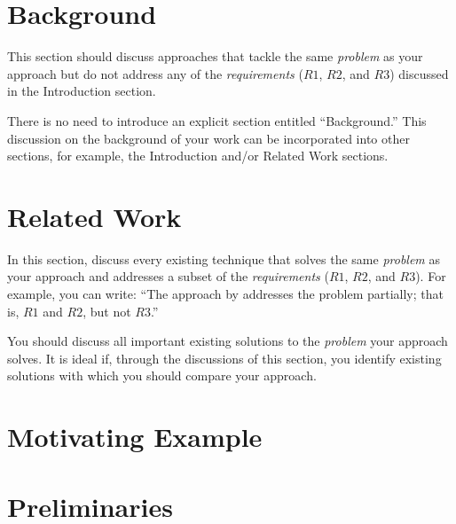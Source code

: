 \section{Background}
\label{sec:background}

This section should discuss approaches that tackle the same \emph{problem} as your approach but do not address any of the \emph{requirements} ($R1$, $R2$, and $R3$) discussed in the Introduction section.

There is no need to introduce an explicit section entitled ``Background.''
This discussion on the background of your work can be incorporated into other sections, for example, the Introduction and/or Related Work sections.

\section{Related Work}
\label{sec:related:work}

In this section, discuss every existing technique that solves the same \emph{problem} as your approach and addresses a subset of the \emph{requirements} ($R1$, $R2$, and $R3$).
For example, you can write: ``The approach by \citet{PolyvyanyyPQM2022} addresses the problem partially; that is, $R1$ and $R2$, but not $R3$.''

You should discuss all important existing solutions to the \emph{problem} your approach solves.
It is ideal if, through the discussions of this section, you identify existing solutions with which you should compare your approach.

\section{Motivating Example}
\label{sec:motivating:example}

\section{Preliminaries}
\label{sec:preliminaries}

